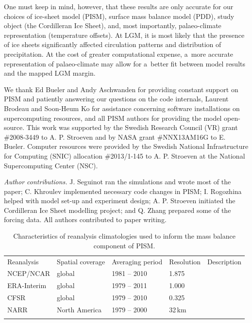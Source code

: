 \documentclass[tc, ms]{copernicus}
\begin{document}
One must keep in mind, however, that these results are only accurate for our choices of ice-sheet model (PISM), surface mass balance model (PDD), study object (the Cordilleran Ice Sheet), and, most importantly, palaeo-climate representation (temperature offsets). At LGM, it is most likely that the presence of ice sheets significantly affected circulation patterns and distribution of precipitation. At the cost of greater computational expense, a~more accurate representation of palaeo-climate may allow for a~better fit between model results and the mapped LGM margin.

\begin{acknowledgements}
We thank Ed Bueler and Andy Aschwanden for providing constant support on PISM and patiently answering our questions on the code internals, Laurent Brodeau and Soon-Heum Ko for assistance concerning software installations on supercomputing resources, and all PISM authors for providing the model open-source. This work was supported by the Swedish Research Council (VR) grant \#2008-3449 to A. P. Stroeven and by NASA grant \#NNX13AM16G to E. Bueler. Computer resources were provided by the Swedish National Infrastructure for Computing (SNIC) allocation \#2013/1-145 to A. P. Stroeven at the National Supercomputing Center (NSC). 

\textit{Author contributions.}
J. Seguinot ran the simulations and wrote most of the paper; C. Khroulev implemented necessary code changes in PISM; I. Rogozhina helped with model set-up and experiment design; A. P. Stroeven initiated the Cordilleran Ice Sheet modelling project; and Q. Zhang prepared some of the forcing data. All authors contributed to paper writing.
\end{acknowledgements}




\newpage

\begin{table}[t]
	\caption{Characteristics of reanalysis climatologies used to inform the mass balance component of PISM.}
	\label{tab:reanalyses}
	\vskip4mm
	\centering
	\begin{tabular}{lllll}
		\tophline
		Reanalysis& Spatial coverage& Averaging period& Resolution& Description\\
		\middlehline
		NCEP/NCAR&  global&     1981 -- 2010& 1.875\degree& \citet{data:ncar}\\
		ERA-Interim&global&     1979 -- 2011& 1.000\degree& \citet{data:erai}\\
		CFSR&       global&     1979 -- 2010& 0.325\degree& \citet{data:cfsr}\\
		NARR&       North America& 1979 -- 2000& 32\,km& \citet{data:narr}\\
		\bottomhline
	\end{tabular}
\end{table}
\end{document}
